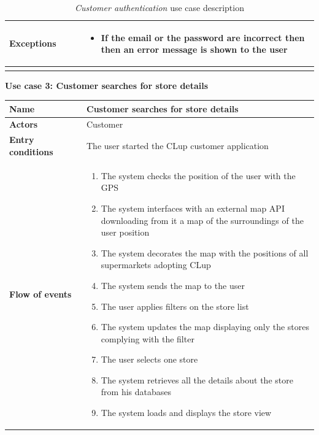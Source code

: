 \begin{longtable}{p{0.25\linewidth}p{0.75\linewidth}}
    \midrule
    \textbf{Exceptions}       &
    \begin{itemize}
        \item If the email or the password are incorrect then then an error message is shown to the user
    \end{itemize}                                                                                                                           \\
    \bottomrule
    \caption{\emph{Customer authentication} use case description}
\end{longtable}

\clearpage
\textbf{Use case 3: Customer searches for store details}
\smallskip
{}
\begin{longtable}{p{0.25\linewidth}p{0.75\linewidth}}
    \toprule
    \textbf{Name}                             & \textbf{Customer searches for store details}      \\
    \midrule
    \textbf{Actors}                           & Customer                                          \\
    \midrule
    \textbf{Entry conditions}                 & The user started the CLup customer application    \\
    \midrule
    \textbf{Flow of events}                   &
    \begin{enumerate}
        \item The system checks the position of the user with the GPS
        \item The system interfaces with an external map API downloading from it a map of the surroundings of the user position
        \item The system decorates the map with the positions of all supermarkets adopting CLup
        \item The system sends the map to the user
        \item The user applies filters on the store list
        \item The system updates the map displaying only the stores complying with the filter
        \item The user selects one store
        \item The system retrieves all the details about the store from his databases
        \item The system loads and displays the store view
    \end{enumerate}                                                                     \\

\end{longtable}

